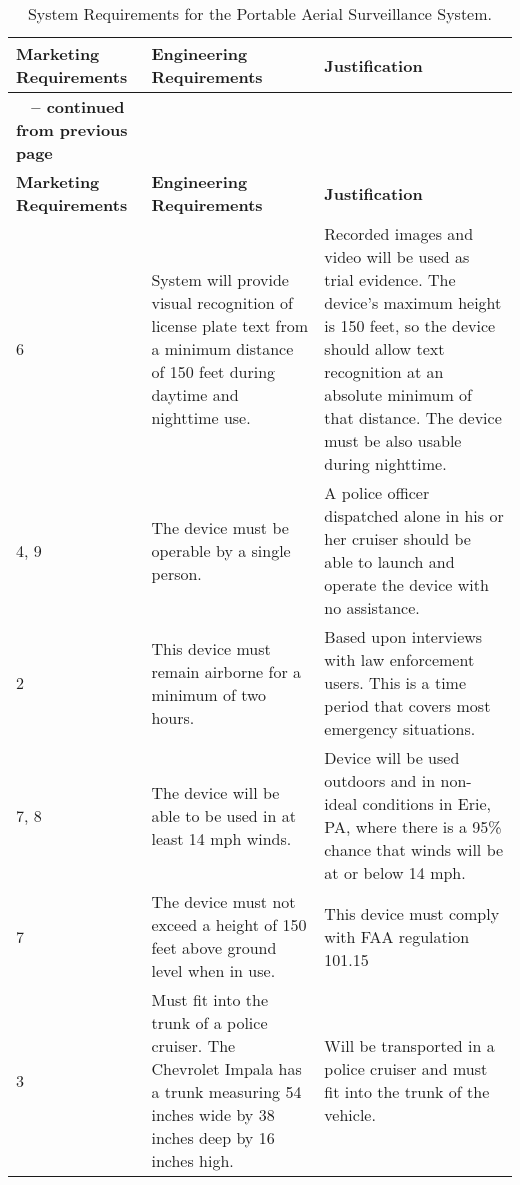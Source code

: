 \begin{longtable}{ |p{2.5cm}|p{5cm}|p{5.5cm}|} 
\caption{System Requirements for the Portable Aerial Surveillance System.}
\label{table:portableAerial}\\

\hline
\rowcolor{Gray}
\textbf{Marketing Requirements} & \textbf{Engineering Requirements} & \textbf{Justification} \\ \hline
\endfirsthead

\hline
\rowcolor{Gray}
\multicolumn{3}{|c|}
{{\bfseries \tablename\ \thetable{} -- continued from previous page}} \\ \hline
\rowcolor{Gray}
\textbf{Marketing Requirements} & \textbf{Engineering Requirements} & \textbf{Justification} \\ \hline
\endhead
\endfoot

6 & 
 System will provide visual recognition of license plate text from a
  minimum distance of 150 feet during daytime and nighttime use. &
   Recorded images and video will be used as trial
evidence. The device's maximum height is 150 feet, so
the device should allow text recognition at an absolute minimum of that
distance. The device must be also usable during nighttime.\\ \hline

4, 9 & 
   The device must be operable by a single person. &
 A police officer dispatched alone in his or her cruiser
should be able to launch and operate the device with no assistance. \\ \hline

2 & 
 This device must remain airborne for a minimum of two hours. &
Based upon interviews with law enforcement users. This
is a time period that covers most emergency situations. \\ \hline

7, 8 & 
 The device will be able to be used in at least 14 mph winds.&
 Device will be used outdoors and in non-ideal
conditions in Erie, PA, where there is a 95\% chance that winds will be
at or below 14 mph. \\ \hline

7 & 
  The device must not exceed a height of 150 feet above ground level
  when in use. &
  This device must comply with FAA regulation 101.15 \\ \hline
  
3 & 

  Must fit into the trunk of a police cruiser. The Chevrolet Impala has
  a trunk measuring 54 inches wide by 38 inches deep by 16 inches high. &
 Will be transported in a police cruiser and must fit
into the trunk of the vehicle. \\ \hline


\end{longtable}

